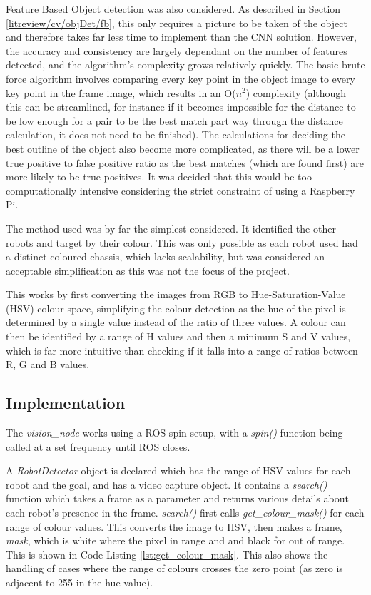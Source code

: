 Feature Based Object detection was also considered. As described in Section \ref{litreview/cv/objDet/fb}, this only requires a picture to be taken of the object and therefore takes far less time to 
implement than the CNN solution. However, the accuracy and 
consistency are largely dependant on the number of features 
detected, and the algorithm's complexity grows relatively 
quickly. The basic brute force algorithm involves comparing 
every key point in the object image to every key point in the 
frame image, which results in an O($n^2$) complexity (although 
this can be streamlined, for instance if it becomes impossible 
for the distance to be low enough for a pair to be the best 
match part way through the distance calculation, it does not 
need to be finished). The calculations for deciding the best 
outline of the object also become more complicated, as there 
will be a lower true positive to false positive ratio as the 
best matches (which are found first) are more likely to be 
true positives. It was decided that this would be too  
computationally intensive considering the strict constraint of 
using a Raspberry Pi. 

The method used was by far the simplest considered. It identified the other robots and target by their colour. This was only possible as each robot used had a distinct coloured chassis, which lacks scalability, but was considered an acceptable simplification as this was not the focus of the project. 

This works by first converting the images from RGB to Hue-Saturation-Value (HSV) colour space, simplifying the colour detection as the hue of the pixel is determined by a single value instead of the ratio of three values. A colour can then be identified by a range of H values and then a minimum S and V values, which is far more intuitive than checking if it falls into a range of ratios between R, G and B values. 

\subsection{Implementation}\label{soft/cv/impl}
The \textit{vision\_node} works using a ROS spin setup, with a \textit{spin()} function being called at a set frequency until ROS closes. 

A \textit{RobotDetector} object is declared which has the range of HSV values for each robot and the goal, and has a video capture object. It contains a \textit{search()} function which takes a frame as a parameter and returns various details about each robot's presence in the frame. \textit{search()} first calls \textit{get\_colour\_mask()} for each range of colour values. This converts the image to HSV, then makes a frame, \textit{mask}, which is white where the pixel in range and and black for out of range. This is shown in Code Listing \ref{lst:get_colour_mask}. This also shows the handling of cases where the range of colours crosses the zero point (as zero is adjacent to 255 in the hue value).

